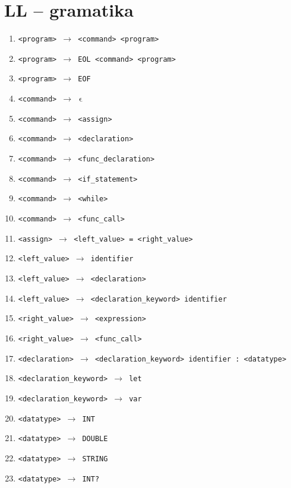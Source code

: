 \documentclass[a4paper, 11pt]{article}
\begin{document}
	\section*{LL -- gramatika}
	{ \fontsize{10}{10}\selectfont 
	\begin{enumerate}[noitemsep]
		
		\item \texttt{<program> $\rightarrow$ <command> <program>}
		\item \texttt{<program> $\rightarrow$ EOL <command> <program>}
		\item \texttt{<program> $\rightarrow$ EOF}
		\item \texttt{<command> $\rightarrow\,\,\upvarepsilon$}
		\item \texttt{<command> $\rightarrow$ <assign>}
		\item \texttt{<command> $\rightarrow$ <declaration>}
		\item \texttt{<command> $\rightarrow$ <func\_declaration>}
		\item \texttt{<command> $\rightarrow$ <if\_statement>}
		\item \texttt{<command> $\rightarrow$ <while>}
		\item \texttt{<command> $\rightarrow$ <func\_call>}
		\item \texttt{<assign> $\rightarrow$ <left\_value> = <right\_value>}
		\item \texttt{<left\_value> $\rightarrow$ identifier}
		\item \texttt{<left\_value> $\rightarrow$ <declaration>}
		\item \texttt{<left\_value> $\rightarrow$ <declaration\_keyword> identifier}
		\item \texttt{<right\_value> $\rightarrow$ <expression>}
		\item \texttt{<right\_value> $\rightarrow$ <func\_call>}
		\item \texttt{<declaration> $\rightarrow$ <declaration\_keyword> identifier : <datatype>}
		\item \texttt{<declaration\_keyword> $\rightarrow$ let}
		\item \texttt{<declaration\_keyword> $\rightarrow$ var}
		\item \texttt{<datatype> $\rightarrow$ INT}
		\item \texttt{<datatype> $\rightarrow$ DOUBLE}
		\item \texttt{<datatype> $\rightarrow$ STRING}
		\item \texttt{<datatype> $\rightarrow$ INT?}

\end{enumerate}}
\end{document}
